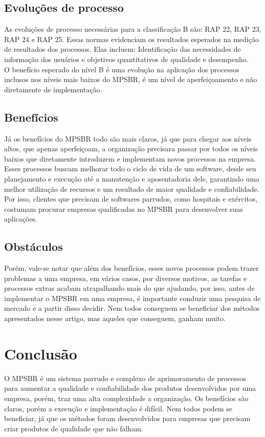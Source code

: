 \documentclass{article}
\begin{document}
\subsection{Evoluções de processo}
As evoluções de processo necessárias para a classificação B são: RAP 22, RAP 23, RAP 24 e RAP 25. Essas normas evidenciam os resultados esperados na medição de resultados dos processos. Elas incluem: Identificação das necessidades de informação dos usuários e objetivos quantitativos de qualidade e desempenho. \\
O benefício esperado do nível B é uma evolução na aplicação dos processos inclusos nos níveis mais baixos do MPSBR, é um nível de aperfeiçoamento e não diretamente de implementação.
\subsection{Benefícios}
Já os benefícios do MPSBR todo são mais claros, já que para chegar aos níveis altos, que apenas aperfeiçoam, a organização precisara passar por todos os níveis baixos que diretamente introduzem e implementam novos processos na empresa. Esses processos buscam melhorar todo o ciclo de vida de um software, desde seu planejamento e execução até a manutenção e aposentadoria dele, garantindo uma melhor utilização de recursos e um resultado de maior qualidade e confiabilidade. Por isso, clientes que precisam de softwares parrudos, como hospitais e exércitos, costumam procurar empresas qualificadas no MPSBR para desenvolver suas aplicações.
\subsection{Obstáculos}
Porém, vale-se notar que além dos benefícios, esses novos processos podem trazer problemas a uma empresa, em vários casos, por diversos motivos, as tarefas e processos extras acabam atrapalhando mais do que ajudando, por isso, antes de implementar o MPSBR em uma empresa, é importante conduzir uma pesquisa de mercado e a partir disso decidir. Nem todos conseguem se beneficiar dos métodos apresentados nesse artigo, mas aqueles que conseguem, ganham muito.

\section{Conclusão}
O MPSBR é um sistema parrudo e complexo de aprimoramento de processos para aumentar a qualidade e confiabilidade dos produtos desenvolvidos por uma empresa, porém, traz uma alta complexidade a organização. Os benefícios são claros, porém a execução e implementação é difícil. Nem todos podem se beneficiar, já que os métodos foram desenvolvidos para empresas que precisam criar produtos de qualidade que não falham.
\end{document}
